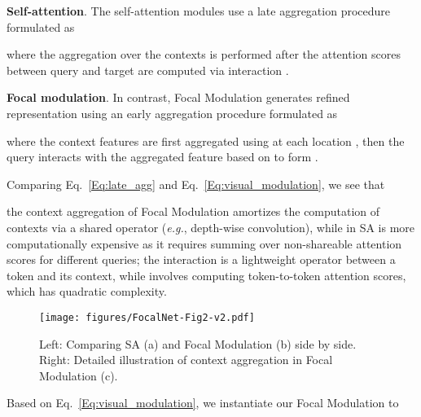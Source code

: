 \documentclass{article}
\begin{document}
\textbf{Self-attention}. The self-attention modules use a late aggregation procedure formulated as  

where the aggregation   over the contexts  is performed after the attention scores between query and target are computed via interaction .


\textbf{Focal modulation}. In contrast, Focal Modulation generates refined representation  using an early aggregation procedure formulated as

where the context features are first aggregated using  at each location , then the query interacts with the aggregated feature based on  to form . 


Comparing Eq.~\eqref{Eq:late_agg} and Eq.~\eqref{Eq:visual_modulation}, we see that

the context aggregation of Focal Modulation  amortizes the computation of contexts via a shared operator (\textit{e.g.}, depth-wise convolution), while  in SA is more computationally expensive as it requires summing over non-shareable attention scores for different queries;  
 the interaction  is a lightweight operator between a token and its context, while  involves computing token-to-token attention scores, which has quadratic complexity. 


\begin{figure}[t]
	\centering
	\texttt{[image: figures/FocalNet-Fig2-v2.pdf]}
\captionsetup{font=footnotesize}
    \caption{Left: Comparing SA (a) and Focal Modulation (b) side by side. Right: Detailed illustration of context aggregation in Focal Modulation (c).}
    \label{fig:model}
\vspace{-3mm}
\end{figure}

Based on Eq.~\eqref{Eq:visual_modulation}, we instantiate our Focal Modulation to
\end{document}
